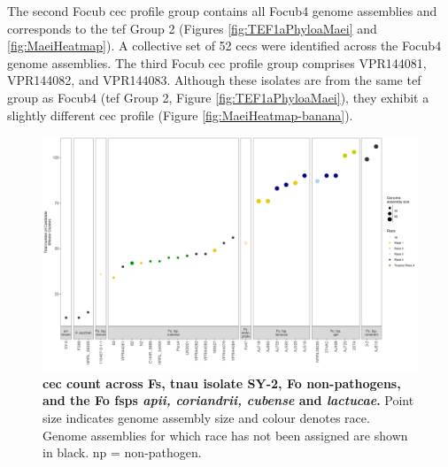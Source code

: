 The second \ac{Focub} \ac{cec} profile group contains all \ac{Focub4} genome assemblies and corresponds to the \ac{tef} Group 2 (Figures  \ref{fig:TEF1aPhyloaMaei} and \ref{fig:MaeiHeatmap}). A collective set of 52 \acp{cec} were identified across the \ac{Focub4} genome assemblies. The third  \ac{Focub} \ac{cec} profile group comprises VPR144081, VPR144082, and VPR144083. Although these isolates are from the same \ac{tef} group as \ac{Focub4} (\ac{tef} Group 2, Figure \ref{fig:TEF1aPhyloaMaei}), they exhibit a slightly different \ac{cec} profile (Figure \ref{fig:MaeiHeatmap-banana}). 

\begin{figure}
    \centering
    \includegraphics[width=22cm]{Figures/CecDistribinFspOfInterest.png}
    \captionsetup{width=20cm}
    \caption[\Acl{cec} count across \acl{Fs}, \ac{tnau} isolate SY-2, \acl{Fo} non-pathogens, and the \ac{Fo} \acp{fsp} \textit{apii, coriandrii, cubense} and \textit{lactucae}.]{\textbf{\Acf{cec} count across \acl{Fs}, \ac{tnau} isolate SY-2, \acf{Fo} non-pathogens, and the \ac{Fo} \acp{fsp} \textit{apii, coriandrii, cubense} and \textit{lactucae}.} Point size indicates genome assembly size and colour denotes race. Genome assemblies for which race has not been assigned are shown in black. np = non-pathogen.}
    \label{fig:CECcount}
\end{figure}


